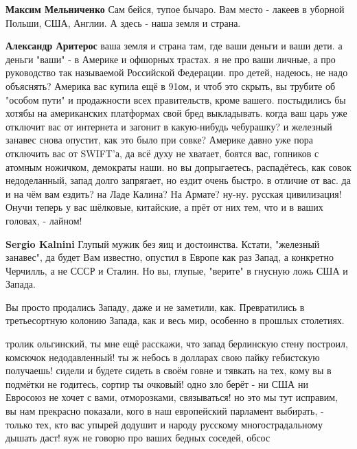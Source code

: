 \begin{itemize}
\begin{itemize}
\textbf{Максим Мельниченко} Сам бейся, тупое бычаро.
Вам место - лакеев в уборной Польши, США, Англии. А здесь - наша земля и страна.


\textbf{Александр Аритерос} ваша земля и страна там, где ваши деньги и ваши
дети. а деньги "ваши" - в Америке и офшорных трастах. я не про ваши личные, а
про руководство так называемой Российской Федерации. про детей, надеюсь, не
надо объяснять? Америка вас купила ещё в 91ом, и чтоб это скрыть, вы трубите об
"особом пути" и продажности всех правительств, кроме вашего. постыдились бы
хотябы на американских платформах свой бред выкладывать. когда ваш царь уже
отключит вас от интернета и загонит в какую-нибудь чебурашку? и железный
занавес снова опустит, как это было при совке? Америке давно уже пора отключить
вас от SWIFT'а, да всё духу не хватает, боятся вас, гопников с атомным
ножичком, демократы наши. но вы допрыгаетесь, распадётесь, как совок
недоделанный, запад долго запрягает, но ездит очень быстро. в отличие от вас.
да и на чём вам ездить? на Ладе Калина? На Армате? ну-ну. русская цивилизация!
Онучи теперь у вас шёлковые, китайские, а прёт от них тем, что и в ваших
головах, - лайном!


\textbf{Sergio Kalnini} Глупый мужик без яиц и достоинства.
Кстати, "железный занавес", да будет Вам известно, опустил в Европе как раз Запад, а конкретно Черчилль, а не СССР и Сталин. Но вы, глупые, "верите" в гнусную ложь США и Запада.


Вы просто продались Западу, даже и не заметили, как. Превратились в третьесортную колонию Запада, как и весь мир, особенно в прошлых столетиях.



тролик ольгинский, ты мне ещё расскажи, что запад берлинскую стену построил,
комсючок недодавленный! ты ж небось в долларах свою пайку гебистскую получаешь!
сидели и будете сидеть в своём говне и тявкать на тех, кому вы в подмётки не
годитесь, сортир ты очковый! одно зло берёт - ни США ни Евросоюз не хочет с
вами, отморозками, связываться! но это мы тут исправим, вы нам прекрасно
показали, кого в наш европейский парламент выбирать, - только тех, кто вас
упырей додушит и народу русскому многострадальному дышать даст! яуж не говорю
про ваших бедных соседей, обсос



\end{itemize}
\end{itemize}
